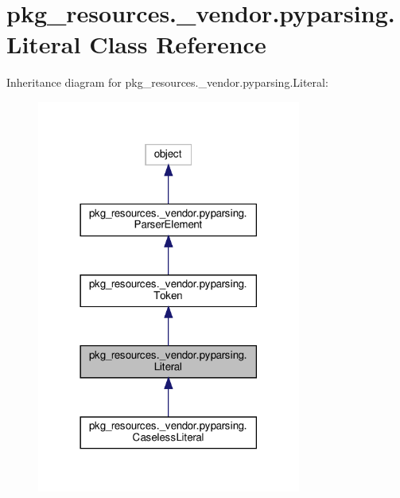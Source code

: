\hypertarget{classpkg__resources_1_1__vendor_1_1pyparsing_1_1Literal}{}\section{pkg\+\_\+resources.\+\_\+vendor.\+pyparsing.\+Literal Class Reference}
\label{classpkg__resources_1_1__vendor_1_1pyparsing_1_1Literal}


Inheritance diagram for pkg\+\_\+resources.\+\_\+vendor.\+pyparsing.\+Literal\+:
\nopagebreak
\begin{figure}[H]
\begin{center}
\leavevmode
\includegraphics[width=246pt]{classpkg__resources_1_1__vendor_1_1pyparsing_1_1Literal__inherit__graph}
\end{center}
\end{figure}


